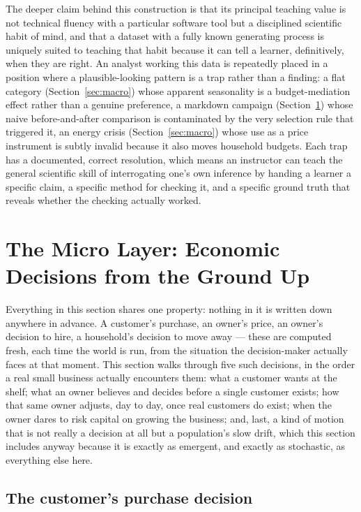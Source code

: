 \documentclass[12pt,a4paper]{article}
\begin{document}
The deeper claim behind this construction is that its principal teaching
value is not technical fluency with a particular software tool but a
disciplined scientific habit of mind, and that a dataset with a fully
known generating process is uniquely suited to teaching that habit
because it can tell a learner, definitively, when they are right. An
analyst working this data is repeatedly placed in a position where a
plausible-looking pattern is a trap rather than a finding: a flat
category (Section~\ref{sec:macro}) whose apparent seasonality is a
budget-mediation effect rather than a genuine preference, a markdown
campaign (Section~\ref{sec:micro}) whose naive before-and-after
comparison is contaminated by the very selection rule that triggered it,
an energy crisis (Section~\ref{sec:macro}) whose use as a price
instrument is subtly invalid because it also moves household budgets.
Each trap has a documented, correct resolution, which means an
instructor can teach the general scientific skill of interrogating one's
own inference by handing a learner a specific claim, a specific method
for checking it, and a specific ground truth that reveals whether the
checking actually worked.

\section{The Micro Layer: Economic Decisions from the Ground Up}
\label{sec:micro}

Everything in this section shares one property: nothing in it is written
down anywhere in advance. A customer's purchase, an owner's price, an
owner's decision to hire, a household's decision to move away --- these
are computed fresh, each time the world is run, from the situation the
decision-maker actually faces at that moment. This section walks through
five such decisions, in the order a real small business actually
encounters them: what a customer wants at the shelf; what an owner
believes and decides before a single customer exists; how that same
owner adjusts, day to day, once real customers do exist; when the owner
dares to risk capital on growing the business; and, last, a kind of
motion that is not really a decision at all but a population's slow
drift, which this section includes anyway because it is exactly as
emergent, and exactly as stochastic, as everything else here.

\subsection{The customer's purchase decision}
\label{sec:micro-customer}
\end{document}
